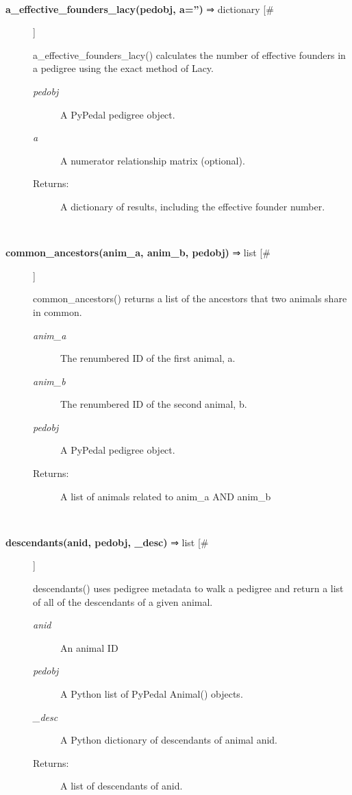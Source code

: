 \begin{description}
\begin{description}
\end{description}
\\ 

\item[\textbf{a\_effective\_founders\_lacy(pedobj, a='')}
 ⇒ dictionary [\#]]

 a\_effective\_founders\_lacy() calculates the number of effective founders in a pedigree using the exact method of Lacy.
\begin{description}
\item[\emph{pedobj}
] A PyPedal pedigree object.
\item[\emph{a}
] A numerator relationship matrix (optional).
\item[Returns:] A dictionary of results, including the effective founder number.

\end{description}
\\ 

\item[\textbf{common\_ancestors(anim\_a, anim\_b, pedobj)}
 ⇒ list [\#]]

 common\_ancestors() returns a list of the ancestors that two animals share in common.
\begin{description}
\item[\emph{anim\_a}
] The renumbered ID of the first animal, a.
\item[\emph{anim\_b}
] The renumbered ID of the second animal, b.
\item[\emph{pedobj}
] A PyPedal pedigree object.
\item[Returns:] A list of animals related to anim\_a AND anim\_b

\end{description}
\\ 

\item[\textbf{descendants(anid, pedobj, \_desc)}
 ⇒ list [\#]]

 descendants() uses pedigree metadata to walk a pedigree and return a list of all of the descendants of a given animal.
\begin{description}
\item[\emph{anid}
] An animal ID
\item[\emph{pedobj}
] A Python list of PyPedal Animal() objects.
\item[\emph{\_desc}
] A Python dictionary of descendants of animal anid.
\item[Returns:] A list of descendants of anid.


\end{description}
\end{description}

